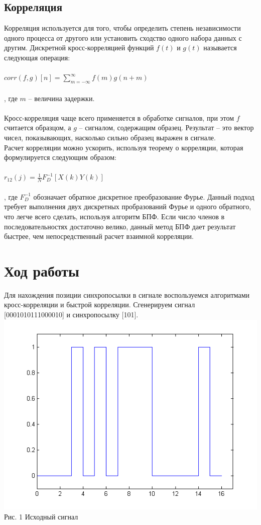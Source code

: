 \documentclass[a4paper]{article}
\begin{document}
\subsection{Корреляция}
Корреляция используется для того, чтобы определить степень независимости одного процесса от другого или установить сходство одного набора данных с другим.
Дискретной кросс-корреляцией функций $f(t)$ и $g(t)$ называется следующая операция:\\\\
$corr(f,g)[n] = {\sum_{m=-{\infty}}^{\infty}}f(m)g(n+m)$\\\\
, где $m$ -- величина задержки. \\\\
Кросс-корреляция чаще всего применяется в обработке сигналов, при этом $f$ считается образцом, а $g$ -- сигналом, содержащим образец. Результат -- это вектор чисел, показывающих, насколько сильно образец выражен в сигнале.\\
Расчет корреляции можно ускорить, используя теорему о корреляции, которая формулируется следующим образом:\\\\
$r_{12}(j)={\frac{1}{N}}F_D^{-1}[X(k)Y(k)]$\\\\
, где $F_D^{-1}$ обозначает обратное дискретное преобразование Фурье. Данный подход требует выполнения двух дискретных пробразований Фурье и одного обратного, что легче всего сделать, используя алгоритм БПФ. Если число членов в последовательностях достаточно велико, данный метод БПФ дает результат быстрее, чем непосредственный расчет взаимной корреляции. 

\section{Ход работы}
Для нахождения позиции синхропосылки в сигнале воспользуемся алгоритмами кросс-корреляции и быстрой корреляции. Сгенерируем сигнал [0001010111000010] и синхропосылку [101].
\center\includegraphics[scale = 0.7]{signal.png} \\ Рис. 1 Исходный сигнал \\ 
\end{document}
